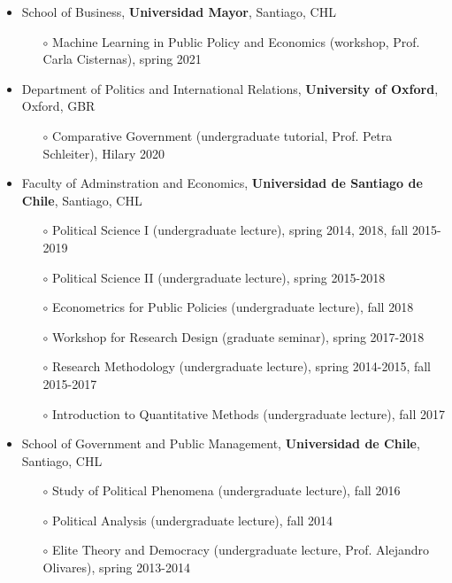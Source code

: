 \begin{publications}

\begin{itemize}
\item{\small School of Business, {\bfseries Universidad Mayor}, Santiago, CHL}
\begin{itemize}
\item[$\circ$]{\small Machine Learning in Public Policy and Economics (workshop, Prof. Carla Cisternas), spring 2021}
\end{itemize}
\item{\small Department of Politics and International Relations, {\bfseries University of Oxford}, Oxford, GBR}
\begin{itemize}
\item[$\circ$]{\small Comparative Government (undergraduate tutorial, Prof. Petra Schleiter), Hilary 2020}
\end{itemize}
\item{\small Faculty of Adminstration and Economics, {\bfseries Universidad de Santiago de Chile}, Santiago, CHL}
\begin{itemize}
\item[$\circ$]{\small Political Science I (undergraduate lecture), spring 2014, 2018, fall 2015-2019}
\item[$\circ$]{\small Political Science II (undergraduate lecture), spring 2015-2018}
\item[$\circ$]{\small Econometrics for Public Policies (undergraduate lecture), fall 2018}
\item[$\circ$]{\small Workshop for Research Design (graduate seminar), spring 2017-2018}
\item[$\circ$]{\small Research Methodology (undergraduate lecture), spring 2014-2015, fall 2015-2017}
\item[$\circ$]{\small Introduction to Quantitative Methods (undergraduate lecture), fall 2017}
\end{itemize}
\item{\small School of Government and Public Management, {\bfseries Universidad de Chile}, Santiago, CHL}
\begin{itemize}
\item[$\circ$]{\small Study of Political Phenomena (undergraduate lecture), fall 2016}
\item[$\circ$]{\small Political Analysis (undergraduate lecture), fall 2014}
\item[$\circ$]{\small Elite Theory and Democracy (undergraduate lecture, Prof. Alejandro Olivares), spring 2013-2014}
\end{itemize}
\end{itemize}

\vspace{1mm}
\end{publications}
